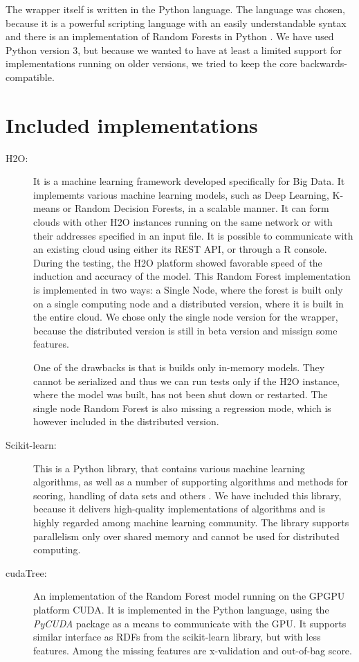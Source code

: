 \documentclass[thesis=B,english]{FITthesis}[2012/10/20]
\begin{document}
The wrapper itself is written in the Python language. The language was chosen, because it is a powerful scripting language with an easily understandable syntax and there is an implementation of Random Forests in Python \cite{scikit-learn}. We have used Python version 3, but because we wanted to have at least a limited support for implementations running on older versions, we tried to keep the core backwards-compatible.

\section{Included implementations}
\begin{description}
\item[H2O:] It is a machine learning framework developed specifically for Big Data. It implememts various machine learning models, such as Deep Learning, K-means or Random Decision Forests, in a scalable manner. It can form clouds with other H2O instances running on the same network or with their addresses specified in an input file. It is possible to communicate with an existing cloud using either its REST API, or through a R console. During the testing, the H2O platform showed favorable speed of the induction and accuracy of the model. This Random Forest implementation is implemented in two ways: a Single Node, where the forest is built only on a single computing node and a distributed version, where it is built in the entire cloud. We chose only the single node version for the wrapper, because the distributed version is still in beta version and missign some features.

One of the drawbacks is that is builds only in-memory models. They cannot be serialized and thus we can run tests only if the H2O instance, where the model was built, has not been shut down or restarted. The single node Random Forest is also missing a regression mode, which is however included in the distributed version.
\item[Scikit-learn:] This is a Python library, that contains various machine learning algorithms, as well as a number of supporting algorithms and methods for scoring, handling of data sets and others \cite{scikit-learn}. We have included this library, because it delivers high-quality implementations of algorithms and is highly regarded among machine learning community. The library supports parallelism only over shared memory and cannot be used for distributed computing.
\item [cudaTree:] An implementation of the Random Forest model running on the GPGPU platform CUDA. It is implemented in the Python language, using the \textit{PyCUDA} package as a means to communicate with the GPU. It supports similar interface as RDFs from the scikit-learn library, but with less features. Among the missing features are x-validation and out-of-bag score.
\end{description}
\end{document}
